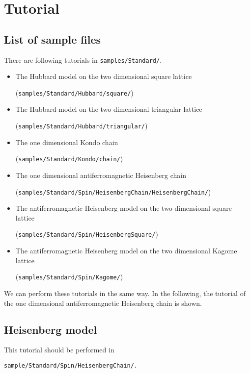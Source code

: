 \chapter{Tutorial}
\label{Ch:model}

\section{List of sample files}

There are following tutorials in \verb|samples/Standard/|.

\begin{itemize}
\item The Hubbard model on the two dimensional square lattice

  (\verb|samples/Standard/Hubbard/square/|)
\item The Hubbard model on the two dimensional triangular lattice
  
  (\verb|samples/Standard/Hubbard/triangular/|)
\item The one dimensional Kondo chain

  (\verb|samples/Standard/Kondo/chain/|)
\item The one dimensional antiferromagnetic Heisenberg chain
  
  (\verb|samples/Standard/Spin/HeisenbergChain/HeisenbergChain/|)
\item The antiferromagnetic Heisenberg model on the two dimensional square lattice
  
  (\verb|samples/Standard/Spin/HeisenbergSquare/|)

\item The antiferromagnetic Heisenberg model on the two dimensional Kagome lattice
  
  (\verb|samples/Standard/Spin/Kagome/|)

\end{itemize}

We can perform these tutorials in the same way. 
In the following, the tutorial of the one dimensional antiferromagnetic Heisenberg chain is shown.

\section{Heisenberg model}

This tutorial should be performed in 
\begin{verbatim}
sample/Standard/Spin/HeisenbergChain/.
\end{verbatim}

